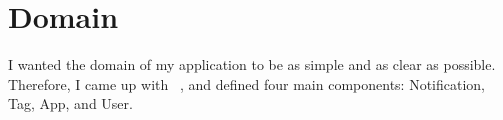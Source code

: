 \section{Domain}\label{sec:domain}

I wanted the domain of my application
to be as simple and as clear as possible.
Therefore,
I came up with
~\cite{evans_domain-driven_2003,millett_patterns_2015},
and defined four main components: Notification, Tag, App, and User.





